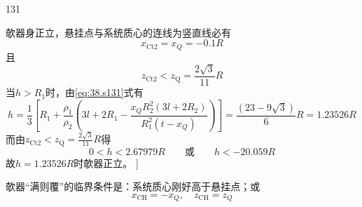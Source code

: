 \begin{solution}{131}
\begin{subsolution}
        欹器身正立，悬挂点与系统质心的连线为竖直线必有
        \begin{equation}
            x _ {\mathrm{Ct2}} = x _ {Q} = - 0.1 R
            \label{eq:38.s131}
        \end{equation}
        且
        \begin{equation}
            z _ {\mathrm{Ct2}} < z _ {\mathrm{Q}} = \frac {2 \sqrt {3}}{11} R
            \label{eq:39.s131}
        \end{equation}
        当$h > R _ { 1 }$时，由\eqref{eq:38.s131}式有
        \begin{equation}
            h = \frac {1}{3} \left[ R _ {1} + \frac {\rho_ {1}}{\rho_ {2}} \left(3 l + 2 R _ {1} - \frac {x _ {Q} R _ {2} ^ {2} (3 l + 2 R _ {2})}{R _ {1} ^ {2} (t - x _ {Q})}\right) \right] = \frac {(23 - 9 \sqrt {3})}{6} R = 1.23526 R
            \label{eq:40.s131}
        \end{equation}
        而由$z _ { \mathrm { C t 2 } } < z _ { \mathrm { Q } } = \frac { 2 \sqrt { 3 } } { 1 1 } R$得
        \begin{equation}
            0 < h < 2.67979 R \qquad \text {或} \qquad h < - 20.059 R
            \label{eq:41.s131}
        \end{equation}
        故$h = 1.23526 R$时欹器正立。
        ]
    \end{subsolution}
    \begin{subsolution}
        欹器“满则覆”的临界条件是：系统质心刚好高于悬挂点；或
        \begin{equation}
            x _ {\mathrm{CH}} = - x _ {Q}, \quad z _ {\mathrm{CH}} = z _ {Q}
            \label{eq:42.s131}
        \end{equation}
    \end{subsolution}
\end{solution}